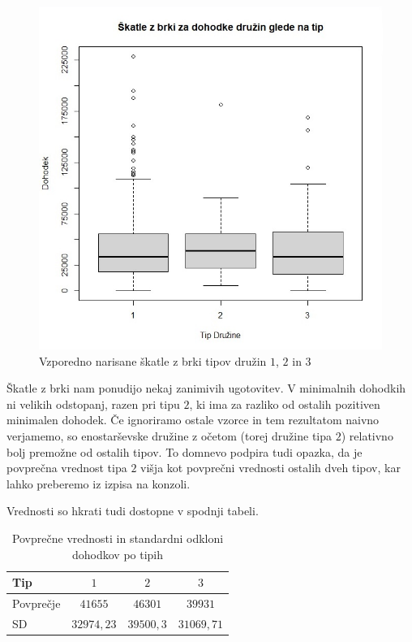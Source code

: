 \documentclass[a4paper, 10pt]{article}
\begin{document}
	\begin{figure}[h!]
		\label{fig: boxplotA}
		\centering
		\includegraphics[scale = 0.35]{TabelaSample1}
		\caption{Vzporedno narisane škatle z brki tipov družin $1$, $2$ in $3$}
	\end{figure}
	Škatle z brki nam ponudijo nekaj zanimivih ugotovitev. V minimalnih dohodkih ni velikih odstopanj, razen pri tipu $2$, ki ima za razliko od ostalih pozitiven minimalen dohodek. Če ignoriramo ostale vzorce in tem rezultatom naivno verjamemo, so enostarševske družine z očetom (torej družine tipa $2$) relativno bolj premožne od ostalih tipov. To domnevo podpira tudi opazka, da je povprečna vrednost tipa $2$ višja kot povprečni vrednosti ostalih dveh tipov, kar lahko preberemo iz izpisa na konzoli. 

	Vrednosti so hkrati tudi dostopne v spodnji tabeli. 

	\begin{table}[h!]
		\label{tab: MeanSDA}
		\centering
		\begin{tabular}{|l|c|c|c|}
			\hline
			Tip & $1$ & $2$ & $3$ \\ \hline
			Povprečje & $41655$ & $46301$ & $39931$ \\ \hline
			SD & $32974{,}23$ & $39500{,}3$ & $31069{,}71$ \\ \hline
		\end{tabular}
	\caption{Povprečne vrednosti in standardni odkloni dohodkov po tipih}
	\end{table}
\end{document}
